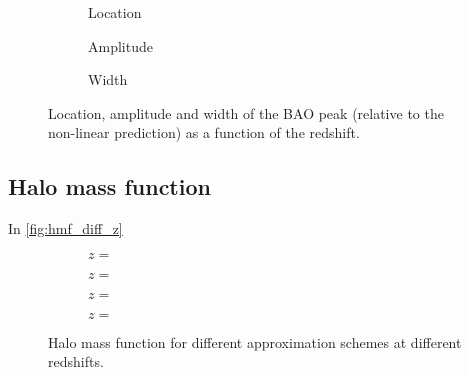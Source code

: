 \begin{figure}
\centering
	\begin{subfigure}{\textwidth}
	\end{subfigure}
	\begin{subfigure}{\textwidth}
		\centering
		\caption{Location}
	\end{subfigure}
	\begin{subfigure}{\textwidth}
		\centering
		\caption{Amplitude}
	\end{subfigure}
	\begin{subfigure}{\textwidth}
		\centering
		\caption{Width}
	\end{subfigure}
	\caption{Location, amplitude and width of the BAO peak (relative to the non-linear prediction) as a function of the redshift.}
	\label{fig:corr_peak}
\end{figure}

\subsection{Halo mass function}
In \autoref{fig:hmf_diff_z}
\begin{figure*}
	\centering
		\begin{subfigure}{1.0\textwidth}
		\end{subfigure}
		\begin{subfigure}{0.5\textwidth}
			\caption{$z = $}
		\end{subfigure}%
		\begin{subfigure}{0.5\textwidth}
			\caption{$z = $}
		\end{subfigure}
		\begin{subfigure}{0.5\textwidth}
			\caption{$z = $}
		\end{subfigure}%
		\begin{subfigure}{0.5\textwidth}
			\caption{$z = $}
		\end{subfigure}
		\caption{Halo mass function for different approximation schemes at different redshifts.}
		\label{fig:hmf_diff_z}
	\end{figure*}

